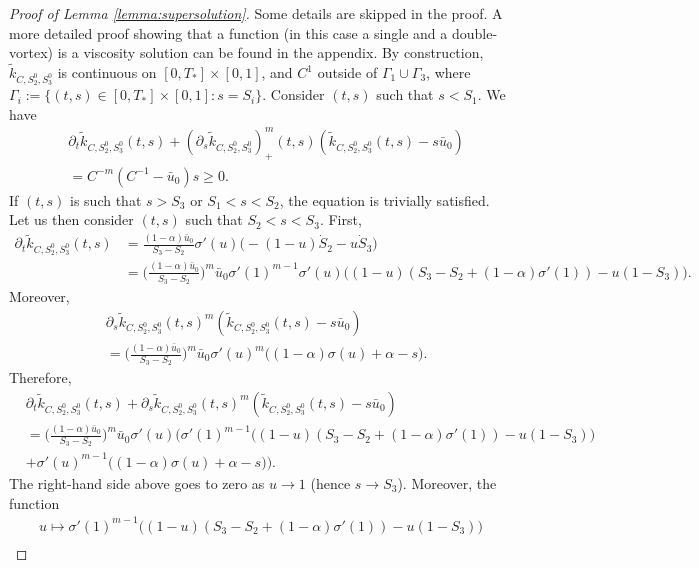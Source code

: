 \documentclass[11pt]{article}
\numberwithin{equation}{section} %
\newcommand{\p}{{\partial}}
\newcommand{\al}{\alpha}
\begin{document}
\begin{proof}[Proof of Lemma \ref{lemma:supersolution}]
Some details are skipped in the proof. A more detailed proof showing that a function (in this case a single and a double-vortex) is a viscosity solution can be found in the appendix.
By construction, $ \tilde k_{C,S_2^0,S_3^0}$ is continuous on $[0,T_*]\times [0,1]$, and $C^1$ outside of $\Gamma_1 \cup \Gamma_3$, where $\Gamma_i := \{(t,s) \in [0,T_*]\times [0,1] : s= S_i \}$. Consider $(t,s)$ such that $s< S_1$. We have
\begin{align*}
    &\p_t \tilde k_{C,S_2^0,S_3^0} (t,s) + (\p_s \tilde k_{C,S_2^0,S_3^0})^m_+(t,s) (\tilde k_{C,S_2^0,S_3^0}(t,s)-s\bar u_0) \\
    &= C^{-m}(C^{-1}-\bar u_0) s \ge 0.
\end{align*}
If $(t,s)$ is such that $s>S_3$ or $S_1<s<S_2$, the equation is trivially satisfied. Let us then consider $(t,s)$ such that $S_2 < s < S_3$. First,
\begin{align*}
    \p_t \tilde k_{C,S_2^0,S_3^0}(t,s) &= \frac{(1-\al)\bar u_0}{S_3-S_2} \sigma'(u) \big( -(1-u)\dot S_2 - u \dot S_3  \big) \\
    &= \bigg(\frac{(1-\al)\bar u_0}{S_3-S_2}\bigg)^m \bar u_0 \sigma'(1)^{m-1} \sigma'(u)  \big( (1-u) (S_3-S_2 + (1-\al)\sigma'(1)) - u(1-S_3)\big).
\end{align*}
Moreover,
\begin{align*}
    &\p_s \tilde k_{C,S_2^0,S_3^0}(t,s)^m(\tilde k_{C,S_2^0,S_3^0}(t,s) -s \bar u_0) \\
    &= \bigg(\frac{(1-\al)\bar u_0}{S_3-S_2}\bigg)^m \bar u_0 \sigma'(u)^m \big( (1-\al) \sigma(u) + \al - s \big) .
\end{align*}
Therefore, 
\begin{align*}
    &\p_t \tilde k_{C,S_2^0,S_3^0}(t,s) +\p_s \tilde k_{C,S_2^0,S_3^0}(t,s)^m(\tilde k_{C,S_2^0,S_3^0}(t,s) -s \bar u_0) \\
    &= \bigg(\frac{(1-\al)\bar u_0}{S_3-S_2}\bigg)^m \bar u_0\sigma'(u)\bigg( \sigma'(1)^{m-1}   \big( (1-u) (S_3-S_2 + (1-\al)\sigma'(1)) - u(1-S_3)\big) \\
    &+ \sigma'(u)^{m-1} \big( (1-\al) \sigma(u) + \al - s \big)  \bigg).
\end{align*}
The right-hand side above goes to zero as $u\to 1$ (hence $s\to S_3$). Moreover, the function 
\begin{multline*}
    u\mapsto \sigma'(1)^{m-1}   \big( (1-u) (S_3-S_2 + (1-\al)\sigma'(1)) - u(1-S_3)\big) \\

\end{multline*}
\end{proof}
\end{document}
